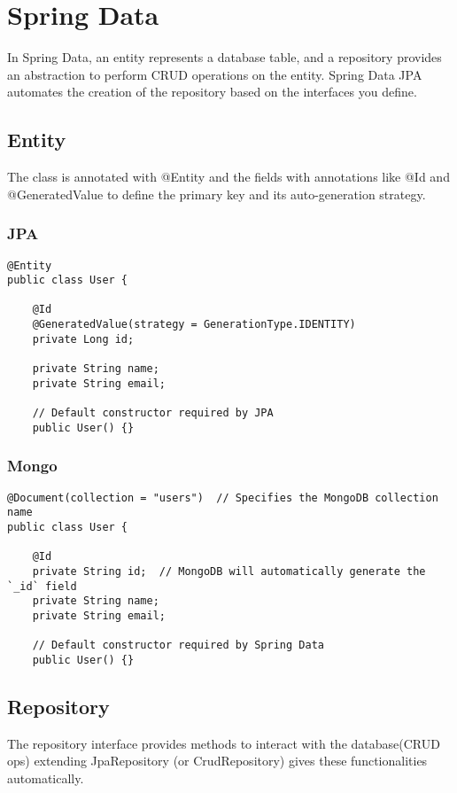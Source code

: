 \documentclass[a4paper, 12pt]{article}
\begin{document}
    \newpage


    \section{Spring Data}

    In Spring Data, an entity represents a database table, and a repository provides an abstraction to perform CRUD operations on the entity. Spring Data JPA automates the creation of the repository based on the interfaces you define.

    \subsection{Entity}
    The class is annotated with @Entity and the fields with annotations like @Id and @GeneratedValue to define the primary key and its auto-generation strategy.

    \subsubsection{JPA}
    \begin{lstlisting}
@Entity
public class User {

    @Id
    @GeneratedValue(strategy = GenerationType.IDENTITY)
    private Long id;

    private String name;
    private String email;

    // Default constructor required by JPA
    public User() {}
    \end{lstlisting}

    \subsubsection{Mongo}
    \begin{lstlisting}
@Document(collection = "users")  // Specifies the MongoDB collection name
public class User {

    @Id
    private String id;  // MongoDB will automatically generate the `_id` field
    private String name;
    private String email;

    // Default constructor required by Spring Data
    public User() {}
    \end{lstlisting}

    \subsection{Repository}
    The repository interface provides methods to interact with the database(CRUD ops) extending JpaRepository (or CrudRepository) gives these functionalities automatically.
\end{document}

